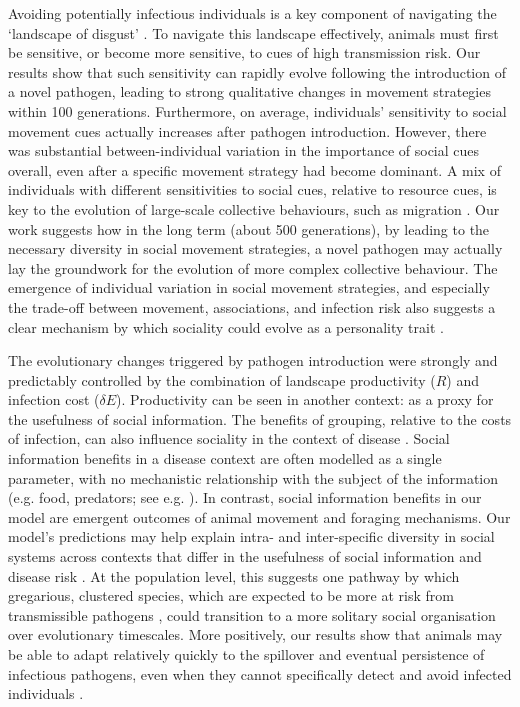 Avoiding potentially infectious individuals is a key component of navigating the `landscape of disgust' \citep{weinstein2018}.
To navigate this landscape effectively, animals must first be sensitive, or become more sensitive, to cues of high transmission risk.
Our results show that such sensitivity can rapidly evolve following the introduction of a novel pathogen, leading to strong qualitative changes in movement strategies within 100 generations.
Furthermore, on average, individuals' sensitivity to social movement cues actually increases after pathogen introduction.
However, there was substantial between-individual variation in the importance of social cues overall, even after a specific movement strategy had become dominant.
A mix of individuals with different sensitivities to social cues, relative to resource cues, is key to the evolution of large-scale collective behaviours, such as migration \citep{guttal2010}.
Our work suggests how in the long term (about 500 generations), by leading to the necessary diversity in social movement strategies, a novel pathogen may actually lay the groundwork for the evolution of more complex collective behaviour.
The emergence of individual variation in social movement strategies, and especially the trade-off between movement, associations, and infection risk also suggests a clear mechanism by which sociality could evolve as a personality trait \citep[][]{gartland2021}.

The evolutionary changes triggered by pathogen introduction were strongly and predictably controlled by the combination of landscape productivity ($R$) and infection cost ($\delta E$).
Productivity can be seen in another context: as a proxy for the usefulness of social information.
The benefits of grouping, relative to the costs of infection, can also influence sociality in the context of disease \citep{almberg2015,ezenwa2016}.
Social information benefits in a disease context are often modelled as a single parameter, with no mechanistic relationship with the subject of the information (e.g. food, predators; see e.g. \citealt{ashby2022}). 
In contrast, social information benefits in our model are emergent outcomes of animal movement and foraging mechanisms.
Our model's predictions may help explain intra- and inter-specific diversity in social systems across contexts that differ in the usefulness of social information and disease risk \citep{lott1991, sah2018}.
At the population level, this suggests one pathway by which gregarious, clustered species, which are expected to be more at risk from transmissible pathogens \citep{sah2018}, could transition to a more solitary social organisation over evolutionary timescales.
More positively, our results show that animals may be able to adapt relatively quickly to the spillover and eventual persistence of infectious pathogens, even when they cannot specifically detect and avoid infected individuals \citep{stroeymeyt2018}.

